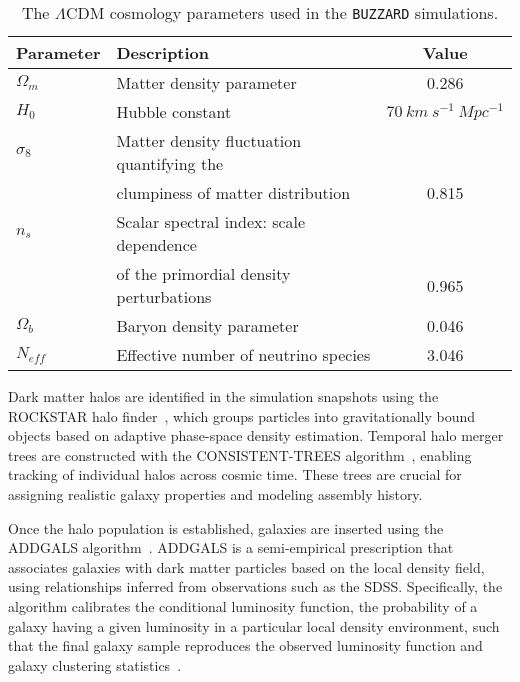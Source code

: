 \begin{table}
    \centering
    \caption[\texttt{BUZZARD} cosmology]{The $\Lambda$CDM cosmology parameters used in the \texttt{BUZZARD} simulations.}
    \label{tab:BUZZARD_cosmology}
    \begin{tabular}{l l c}
        \hline
        \textbf{Parameter} & \textbf{Description} & \textbf{Value} \\
        \hline
        $\Omega_m$ & Matter density parameter & 0.286 \\
        $H_0$ & Hubble constant & $70~{km~s^{-1}~Mpc^{-1}}$ \\
        $\sigma_8$ & Matter density fluctuation quantifying the   & \\
        & clumpiness of matter distribution & 0.815 \\
        $n_s$ & Scalar spectral index: scale dependence & \\
        & of the primordial density perturbations & 0.965 \\
        $\Omega_b$ & Baryon density parameter & 0.046 \\
        $N_{eff}$ & Effective number of neutrino species & 3.046 \\
        \hline
    \end{tabular}
\end{table}

Dark matter halos are identified in the simulation snapshots using the ROCKSTAR halo finder~\citep{behroozi2012rockstar}, which groups particles into gravitationally bound objects based on adaptive phase-space density estimation. Temporal halo merger trees are constructed with the CONSISTENT-TREES algorithm~\citep{behroozi2012gravitationally}, enabling tracking of individual halos across cosmic time. These trees are crucial for assigning realistic galaxy properties and modeling assembly history.

Once the halo population is established, galaxies are inserted using the \ac{ADDGALS} algorithm~\citep{wechsler2022addgals}. \ac{ADDGALS} is a semi-empirical prescription that associates galaxies with dark matter particles based on the local density field, using relationships inferred from observations such as the \ac{SDSS}. Specifically, the algorithm calibrates the conditional luminosity function, the probability of a galaxy having a given luminosity in a particular local density environment, such that the final galaxy sample reproduces the observed luminosity function and galaxy clustering statistics~\citep{DES:2019jmj,wechsler2022addgals}.

